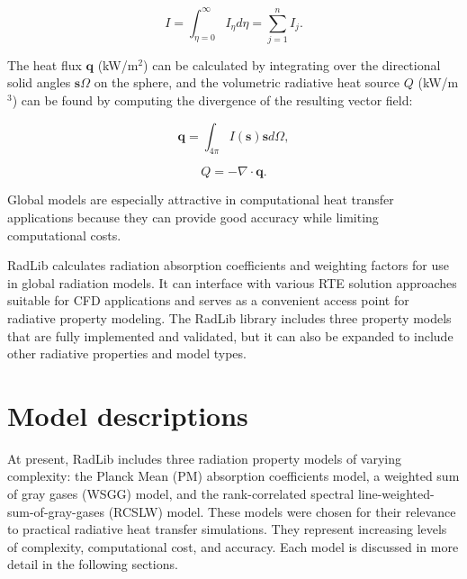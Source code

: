 \documentclass[preprint,12pt]{elsarticle}
\newcounter{bla}
\begin{document}
%
    \begin{linenomath}
        \begin{equation}
            I=\int_{\eta=0}^{\infty}I_{\eta}d\eta=\sum_{j=1}^n I_j.
        \end{equation}
    \end{linenomath}
%
    The heat flux $\mathbf{q}$ (kW/m$^2$) can be calculated by integrating over the directional solid
    angles $\mathbf{s}\Omega$ on the sphere, and the volumetric radiative heat source $Q$ (kW/m$^3$) can be found by
    computing the divergence of the resulting vector field:
%
    \begin{linenomath}
        \begin{equation}
            \mathbf{q} = \int_{4\pi}I(\mathbf{s})\mathbf{s}d\Omega,
        \end{equation}
    \end{linenomath}
%
    \begin{linenomath}
        \begin{equation}
            Q = -\nabla\cdot\mathbf{q}.
        \end{equation}
    \end{linenomath}
%
    Global models are especially attractive in computational heat transfer applications because they can provide good accuracy
    while limiting computational costs.

    RadLib calculates radiation absorption coefficients and weighting factors for use in global
    radiation models. It can interface with various RTE solution approaches suitable for CFD applications and serves
    as a convenient access point for radiative property modeling.
    The RadLib library includes three property models that are fully implemented
    and validated, but it can also be expanded to include other radiative properties and model types.


    \section{Model descriptions} \label{s:models}

    At present, RadLib includes three radiation property models of varying complexity: the Planck Mean (PM) absorption
    coefficients model, a weighted sum of gray gases (WSGG)
    model, and the rank-correlated spectral line-weighted-sum-of-gray-gases (RCSLW) model. These models were chosen
    for their relevance to practical radiative heat transfer simulations. They represent increasing levels of complexity, computational cost, and accuracy. Each model is discussed in more detail in the following sections.
\end{document}
